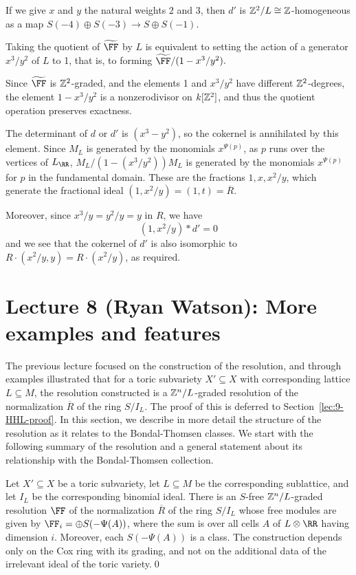 \documentclass{amsart}
\begin{document}
\begin{example} 
If we give $x$ and $y$ the natural weights $2$ and 3, then $d'$ is $\mathbb Z^2/L \cong \mathbb Z$-homogeneous as a map $S(-4) \oplus S(-3) \to S\oplus S(-1)$.

Taking the quotient of $\tF$ by $L$ is equivalent to setting the action of a generator $x^{3}/y^{2}$ of $L$ to 1, that
is, to forming $\tF/(1-x^{3}/y^{2}).$


Since $\tF$ is $\mathbb Z^{2}$-graded, and the elements 1 and $x^{3}/y^{2}$ have
different $\mathbb Z^{2}$-degrees, the element $1-x^{3}/y^{2}$ is a nonzerodivisor on $k[\mathbb Z^{2}]$, and thus
the quotient operation preserves exactness.

The determinant of $d$ or $d'$ is 
$(x^3-y^2)$, so the cokernel is annihilated by this element.
Since $M_L$ is generated by
the monomials $x^{\Psi(p)}$, as $p$ runs over the vertices of $L_\RR$, $M_L/(1-(x^3/y^2))M_L$
is generated by the monomials $x^{\Psi(p)}$ for $p$ in the fundamental domain. 
These are the fractions $1,x,x^2/y$, which generate
the fractional ideal $(1, x^2/y) = (1,t)  = \overline R$.

Moreover, since $x^3/y = y^2/y = y$ in $R$, we have
$$
(1, x^2/y)*d' = 0
$$
and we see that the cokernel of $d'$ is also isomorphic to 
$R\cdot(x^2/y, y) = R\cdot (x^2/y)$, as required.
\end{example}


\section{Lecture 8 (Ryan Watson): More examples and features}\label{lec:8-HHL-examples}

The previous lecture focused on the construction of the resolution, and through examples illustrated that for a toric subvariety $X'\subseteq X$ with corresponding lattice $L\subseteq M$, the resolution constructed is a $\mathbb Z^{n}/L$-graded resolution of the normalization $\overline{R}$ of the ring $S/I_L$. The proof of this is deferred to Section~\ref{lec:9-HHL-proof}. In this section, we describe in more detail the structure of the resolution as it relates to the Bondal-Thomsen classes. We start with the following summary of the resolution and a general statement about its relationship with the Bondal-Thomsen collection.

\begin{cor}
  \label{cor:hhlSummandsBT}
  Let $X'\subseteq X$ be a toric subvariety,  let $L\subseteq M$ be the corresponding sublattice, and let $I_{L}$ be the corresponding binomial ideal. There is an $S$-free $\mathbb Z^{n}/L$-graded resolution $\FF$ of the
  normalization $\overline R$ of the ring $S/I_{L}$ whose free modules are given by $\FF_{i} = \oplus S(-\Psi(A))$, where the sum is over all cells $A$ of $L \otimes \RR$ having dimension $i$. Moreover, each $S(-\Psi(A))$ is a \BT class. 
  The construction depends only on the Cox ring with its grading, and not on the additional data of the
  irrelevant ideal of the toric variety.\qed
\end{cor}
\end{document}
